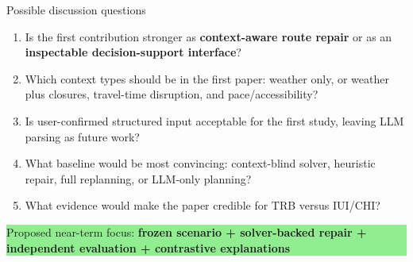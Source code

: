 \documentclass[aspectratio=169,10pt]{beamer}
\newcommand{\key}[1]{\textcolor{MutedBlue}{\textbf{#1}}}
\begin{document}
\begin{frame}{Possible discussion questions}
\large
\begin{enumerate}
\item Is the first contribution stronger as \key{context-aware route repair} or as an \key{inspectable decision-support interface}?
\item Which context types should be in the first paper: weather only, or weather plus closures, travel-time disruption, and pace/accessibility?
\item Is user-confirmed structured input acceptable for the first study, leaving LLM parsing as future work?
\item What baseline would be most convincing: context-blind solver, heuristic repair, full replanning, or LLM-only planning?
\item What evidence would make the paper credible for TRB versus IUI/CHI?
\end{enumerate}

\vspace{0.65em}
\centering
\colorbox{LightGreen}{\parbox{0.82\textwidth}{\centering\large Proposed near-term focus: \textbf{frozen scenario + solver-backed repair + independent evaluation + contrastive explanations}}}
\end{frame}
\end{document}
